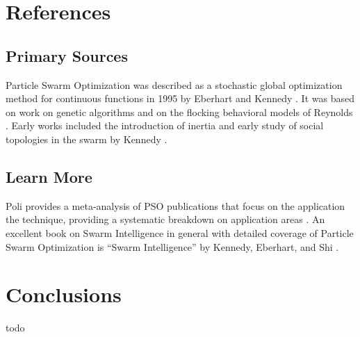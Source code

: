 \documentclass[a4paper, 11pt]{article}
\begin{document}



\section{References}
\label{sec:references}

% 
% 
\subsection{Primary Sources}
Particle Swarm Optimization was described as a stochastic global optimization method for continuous functions in 1995 by Eberhart and Kennedy \cite{Eberhart1995, Kennedy1995}. It was based on work on genetic algorithms and on the flocking behavioral models of Reynolds \cite{Reynolds1987}.
Early works included the introduction of inertia \cite{Shi1998} and early study of social topologies in the swarm by Kennedy \cite{Kennedy1999}. 

% 
% 
\subsection{Learn More}

Poli provides a meta-analysis of PSO publications that focus on the application the technique, providing a systematic breakdown on application areas \cite{Poli2008a}. 
An excellent book on Swarm Intelligence in general with detailed coverage of Particle Swarm Optimization is ``Swarm Intelligence'' by Kennedy, Eberhart, and Shi \cite{Kennedy2001}.

% 
% 
\section{Conclusions}
\label{sec:conclusions}
todo
\end{document}
